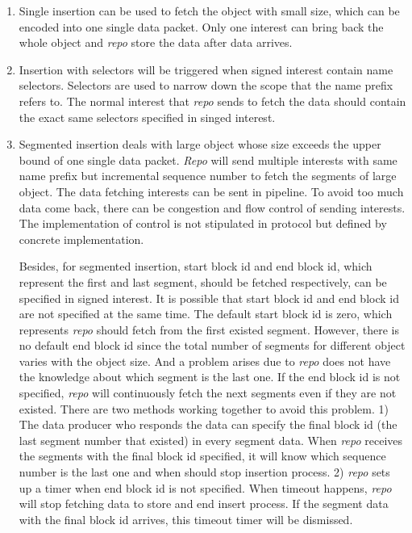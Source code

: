 \documentclass[conference]{IEEEtran}
\begin{document}
\begin{enumerate}
\item Single insertion can be used to fetch the object with small size, which can be encoded into one single data packet. Only one interest can bring back the whole object and \emph{repo} store the data after data arrives.
\item Insertion with selectors will be triggered when signed interest contain name selectors. Selectors are used to narrow down the scope that the name prefix refers to. The normal interest that \emph{repo} sends to fetch the data should contain the exact same selectors specified in singed interest.
\item Segmented insertion deals with large object whose size exceeds the upper bound of one single data packet. \emph{Repo} will send multiple interests with same name prefix but incremental sequence number to fetch the segments of large object. The data fetching interests can be sent in pipeline. To avoid too much data come back, there can be congestion and flow control of sending interests. The implementation of control is not stipulated in protocol but defined by concrete implementation.

    Besides, for segmented insertion, start block id and end block id, which represent the first and last segment, should be fetched respectively, can be specified in signed interest. It is possible that start block id and end block id are not specified at the same time. The default start block id is zero, which represents \emph{repo} should fetch from the first existed segment. However, there is no default end block id since the total number of segments for different object varies with the object size. And a problem arises due to \emph{repo} does not have the knowledge about which segment is the last one. If the end block id is not specified, \emph{repo} will continuously fetch the next segments even if they are not existed. There are two methods working together to avoid this problem. 1) The data producer who responds the data can specify the final block id (the last segment number that existed) in every segment data. When \emph{repo} receives the segments with the final block id specified, it will know which sequence number is the last one and when should stop insertion process. 2) \emph{repo} sets up a timer when end block id is not specified. When timeout happens, \emph{repo} will stop fetching data to store and end insert process. If the segment data with the final block id arrives, this timeout timer will be dismissed.
\end{enumerate}
\end{document}
